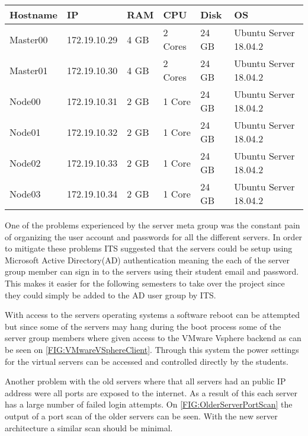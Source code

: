 \begin{table}[H]
\begin{tabular}{|l|l|l|l|l|l|}
\hline
Hostname & IP				& RAM 	& CPU 		& Disk 	& OS 					\\ \hline
Master00 & 172.19.10.29	& 4 GB	& 2 Cores	& 24 GB	& Ubuntu Server 18.04.2	\\ \hline
Master01 & 172.19.10.30	& 4 GB	& 2 Cores	& 24 GB	& Ubuntu Server 18.04.2	\\ \hline			
Node00 	& 172.19.10.31	& 2 GB	& 1 Core		& 24 GB	& Ubuntu Server 18.04.2	\\ \hline
Node01 	& 172.19.10.32	& 2 GB	& 1 Core		& 24 GB	& Ubuntu Server 18.04.2	\\ \hline
Node02 	& 172.19.10.33	& 2 GB	& 1 Core		& 24 GB	& Ubuntu Server 18.04.2	\\ \hline
Node03 	& 172.19.10.34	& 2 GB	& 1 Core		& 24 GB	& Ubuntu Server 18.04.2	\\ \hline
\end{tabular}
\end{table}

One of the problems experienced by the server meta group was the constant pain of organizing the user account and passwords for all the different servers. 
In order to mitigate these problems ITS suggested that the servers could be setup using Microsoft Active Directory(AD) authentication meaning the each of the server group member can sign in to the servers using their student email and password. 
This makes it easier for the following semesters to take over the project since they could simply be added to the AD user group by ITS. 

With access to the servers operating systems a software reboot can be attempted but since some of the servers may hang during the boot process some of the server group members where given access to the VMware Vsphere backend as can be seen on \autoref{FIG:VMwareVSphereClient}. 
Through this system the power settings for the virtual servers can be accessed and controlled directly by the students. 

Another problem with the old servers where that all servers had an public IP address were all ports are exposed to the internet. 
As a result of this each server has a large number of failed login attempts.
On \autoref{FIG:OlderServerPortScan} the output of a port scan of the older servers can be seen. 
With the new server architecture a similar scan should be minimal. 

